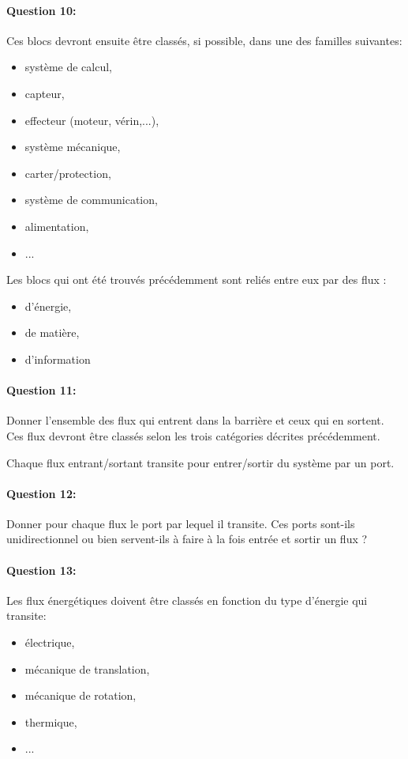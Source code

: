 \paragraph{Question 10:} Ces blocs devront ensuite être classés, si possible, dans une des familles suivantes:
\begin{itemize}
 \item système de calcul,
 \item capteur,
 \item effecteur (moteur, vérin,...),
 \item système mécanique,
 \item carter/protection,
 \item système de communication,
 \item alimentation,
 \item ...
\end{itemize}


Les blocs qui ont été trouvés précédemment sont reliés entre eux par des flux :
\begin{itemize}
 \item d'énergie,
 \item de matière,
 \item d'information
\end{itemize}

\paragraph{Question 11:} Donner l'ensemble des flux qui entrent dans la barrière et ceux qui en sortent. Ces flux devront être classés selon les trois catégories décrites précédemment.

Chaque flux entrant/sortant transite pour entrer/sortir du système par un port.

\paragraph{Question 12:} Donner pour chaque flux le port par lequel il transite. Ces ports sont-ils unidirectionnel ou bien servent-ils à faire à la fois entrée et sortir un flux ?

\paragraph{Question 13:} Les flux énergétiques doivent être classés en fonction du type d'énergie qui transite:
\begin{itemize}
 \item électrique,
 \item mécanique de translation,
 \item mécanique de rotation,
 \item thermique,
 \item ...
\end{itemize}

